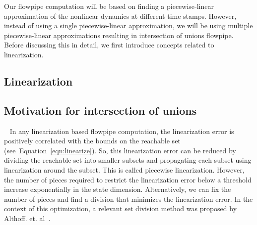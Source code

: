 Our flowpipe computation will be based on finding a piecewise-linear
approximation of the nonlinear dynamics at different time stamps.
However, instead of using a single piecewise-linear approximation, we
will be using multiple piecewise-linear approximations resulting in
intersection of unions flowpipe.  Before discussing this in detail, we
first introduce concepts related to linearization.
%
\subsection{Linearization}

%
\subsection{Motivation for intersection of
unions}~\label{sec:motivation} In any linearization based flowpipe
computation, the linearization error is positively correlated with the
bounds on the reachable set (see~Equation~\ref{eqn:linearize}).  So,
this linearization error can be reduced by dividing the reachable set
into smaller subsets and propagating each subset using linearization
around the subset.  This is called piecewise linearization.  However,
the number of pieces required to restrict the linearization error
below a threshold increase exponentially in the state dimension.
Alternatively, we can fix the number of pieces and find a division
that minimizes the linearization error.  In the context of this
optimization, a relevant set division method was proposed by
Althoff. et. al~\cite{althoff2008reachability}.
%
